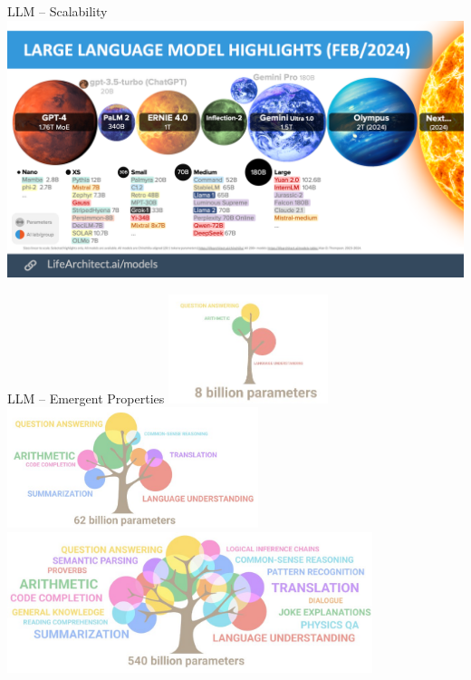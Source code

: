 \documentclass[presentation, 10pt]{beamer}\mode<presentation>{\usetheme{AMSBolognaFC}}
\begin{document}
\begin{frame}{LLM -- Scalability}
	\includegraphics[width=\textwidth]{img/image-size.png}
\end{frame}
\begin{frame}{LLM -- Emergent Properties}
\includegraphics[width=0.35\textwidth]{img/small.jpg}
\includegraphics[width=0.55\textwidth]{img/medium.jpg}
\centering
\includegraphics[width=0.8\textwidth]{img/big.jpg}
\end{frame}
\end{document}
